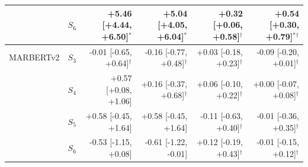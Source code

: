 \begin{tabular}{@{}llrrrr@{}}
 & $S_6$ & +5.46 \scriptsize[+4.44, +6.50]$^{*}$ & +5.04 \scriptsize[+4.05, +6.04]$^{*}$ & +0.32 \scriptsize[+0.06, +0.58]$^{\dagger}$ & +0.54 \scriptsize[+0.30, +0.79]$^{*}$$^{\dagger}$\\
\midrule
MARBERTv2 & $S_3$ & -0.01 \scriptsize[-0.65, +0.64]$^{\dagger}$ & -0.16 \scriptsize[-0.77, +0.48]$^{\dagger}$ & +0.03 \scriptsize[-0.18, +0.23]$^{\dagger}$ & -0.09 \scriptsize[-0.20, +0.01]$^{\dagger}$\\
 & $S_4$ & +0.57 \scriptsize[+0.08, +1.06] & +0.16 \scriptsize[-0.37, +0.68]$^{\dagger}$ & +0.06 \scriptsize[-0.10, +0.22]$^{\dagger}$ & +0.00 \scriptsize[-0.07, +0.08]$^{\dagger}$\\
 & $S_5$ & +0.58 \scriptsize[-0.45, +1.64] & +0.58 \scriptsize[-0.45, +1.64] & -0.11 \scriptsize[-0.63, +0.40]$^{\dagger}$ & -0.01 \scriptsize[-0.36, +0.35]$^{\dagger}$\\
 & $S_6$ & -0.53 \scriptsize[-1.15, +0.08] & -0.61 \scriptsize[-1.22, -0.01] & +0.12 \scriptsize[-0.19, +0.43]$^{\dagger}$ & -0.01 \scriptsize[-0.15, +0.12]$^{\dagger}$\\
\bottomrule\end{tabular}
